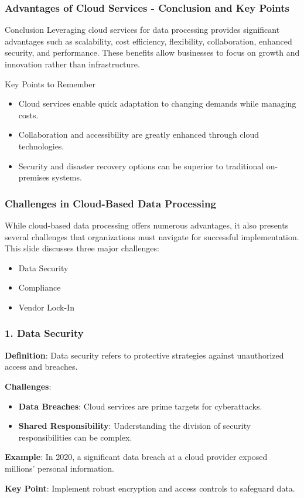 \documentclass{beamer}
\begin{document}
\begin{frame}[fragile]
    \frametitle{Advantages of Cloud Services - Conclusion and Key Points}
    \begin{block}{Conclusion}
        Leveraging cloud services for data processing provides significant advantages such as scalability, cost efficiency, flexibility, collaboration, enhanced security, and performance. These benefits allow businesses to focus on growth and innovation rather than infrastructure.
    \end{block}

    \begin{block}{Key Points to Remember}
        \begin{itemize}
            \item Cloud services enable quick adaptation to changing demands while managing costs.
            \item Collaboration and accessibility are greatly enhanced through cloud technologies.
            \item Security and disaster recovery options can be superior to traditional on-premises systems.
        \end{itemize}
    \end{block}
\end{frame}

\begin{frame}[fragile]
    \frametitle{Challenges in Cloud-Based Data Processing}
    While cloud-based data processing offers numerous advantages, it also presents several challenges that organizations must navigate for successful implementation. This slide discusses three major challenges:
    \begin{itemize}
        \item Data Security
        \item Compliance
        \item Vendor Lock-In
    \end{itemize}
\end{frame}

\begin{frame}[fragile]
    \frametitle{1. Data Security}
    \textbf{Definition}: Data security refers to protective strategies against unauthorized access and breaches.

    \textbf{Challenges}:
    \begin{itemize}
        \item \textbf{Data Breaches}: Cloud services are prime targets for cyberattacks.
        \item \textbf{Shared Responsibility}: Understanding the division of security responsibilities can be complex.
    \end{itemize}

    \textbf{Example}: In 2020, a significant data breach at a cloud provider exposed millions' personal information.

    \textbf{Key Point}: Implement robust encryption and access controls to safeguard data.
\end{frame}
\end{document}
